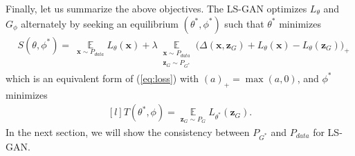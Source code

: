 



Finally, let us summarize the above objectives. The LS-GAN optimizes $L_\theta$ and $G_\phi$ alternately by seeking an equilibrium $(\theta^*,\phi^*)$ such that $\theta^*$ minimizes
\begin{align}\label{eq:theta}
&S(\theta,\phi^*)=~\mathop \mathbb E\limits_{\mathbf x\sim P_{data}} L_\theta(\mathbf x) %
+ \lambda \mathop \mathbb E\limits_{\substack{\mathbf x\sim P_{data} \\ \mathbf z_G\sim P_{G^*}}}\big( \Delta(\mathbf x, \mathbf z_G) + L_\theta(\mathbf x) - L_\theta(\mathbf z_G) \big)_+
\end{align}
which is an equivalent form of (\ref{eq:loss}) with $(a)_+=\max(a,0)$, and $\phi^*$ minimizes
\begin{equation}\label{eq:phi}
\begin{aligned}[l]
T(\theta^*,\phi)=\mathop \mathbb E\limits_{\mathbf z_G\sim P_{G}} L_{\theta^*}(\mathbf z_G).
\end{aligned}
\end{equation}
In the next section, we will show the consistency between $P_{G^*}$ and $P_{data}$ for LS-GAN.

